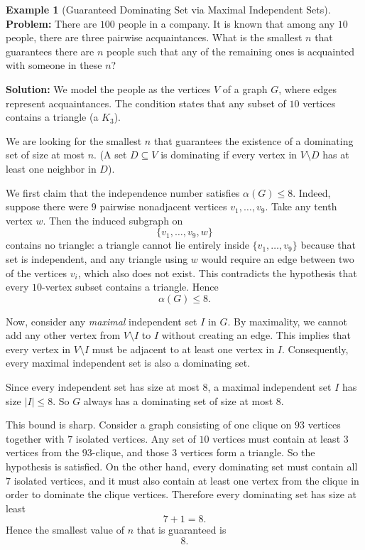 \documentclass[11pt]{article}
\theoremstyle{definition}
\newtheorem{example}{Example}[section]
\begin{document}
\begin{example}[Guaranteed Dominating Set via Maximal Independent Sets]
\textbf{Problem:} There are $100$ people in a company. It is known that among any $10$ people, there are three pairwise acquaintances. What is the smallest $n$ that guarantees there are $n$ people such that any of the remaining ones is acquainted with someone in these $n$?

\textbf{Solution:} We model the people as the vertices $V$ of a graph $G$, where edges represent acquaintances. The condition states that any subset of $10$ vertices contains a triangle (a $K_3$). 

We are looking for the smallest $n$ that guarantees the existence of a dominating set of size at most $n$. (A set $D \subseteq V$ is dominating if every vertex in $V \setminus D$ has at least one neighbor in $D$). 

We first claim that the independence number satisfies $\alpha(G) \le 8$. Indeed, suppose there were $9$ pairwise nonadjacent vertices $v_1,\dots,v_9$. Take any tenth vertex $w$. Then the induced subgraph on
\[
    \{v_1,\dots,v_9,w\}
\]
contains no triangle: a triangle cannot lie entirely inside $\{v_1,\dots,v_9\}$ because that set is independent, and any triangle using $w$ would require an edge between two of the vertices $v_i$, which also does not exist. This contradicts the hypothesis that every $10$-vertex subset contains a triangle. Hence
\[
    \alpha(G) \le 8.
\]

Now, consider any \emph{maximal} independent set $I$ in $G$. By maximality, we cannot add any other vertex from $V \setminus I$ to $I$ without creating an edge. This implies that every vertex in $V \setminus I$ must be adjacent to at least one vertex in $I$. Consequently, every maximal independent set is also a dominating set.

Since every independent set has size at most $8$, a maximal independent set $I$ has size $|I| \le 8$. So $G$ always has a dominating set of size at most $8$.

This bound is sharp. Consider a graph consisting of one clique on $93$ vertices together with $7$ isolated vertices. Any set of $10$ vertices must contain at least $3$ vertices from the $93$-clique, and those $3$ vertices form a triangle. So the hypothesis is satisfied. On the other hand, every dominating set must contain all $7$ isolated vertices, and it must also contain at least one vertex from the clique in order to dominate the clique vertices. Therefore every dominating set has size at least
\[
    7+1=8.
\]
Hence the smallest value of $n$ that is guaranteed is
\[
    \boxed{8}.
\]
\end{example}
\end{document}
